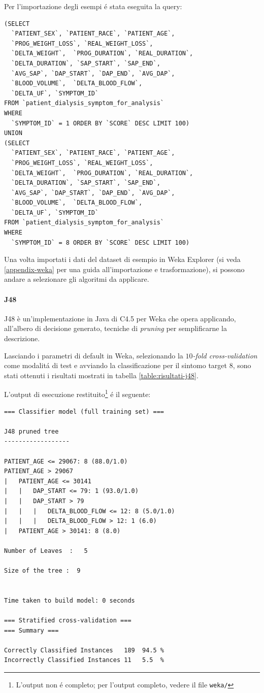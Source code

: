 \documentclass[preprint]{acm_proc_article-sp}
\begin{document}
Per l'importazione degli esempi \'e stata eseguita la query:
\begin{verbatim}
(SELECT 
  `PATIENT_SEX`, `PATIENT_RACE`, `PATIENT_AGE`,
  `PROG_WEIGHT_LOSS`, `REAL_WEIGHT_LOSS`,
  `DELTA_WEIGHT`,  `PROG_DURATION`, `REAL_DURATION`,
  `DELTA_DURATION`, `SAP_START`, `SAP_END`,
  `AVG_SAP`, `DAP_START`, `DAP_END`, `AVG_DAP`, 
  `BLOOD_VOLUME`,  `DELTA_BLOOD_FLOW`, 
  `DELTA_UF`, `SYMPTOM_ID`
FROM `patient_dialysis_symptom_for_analysis`
WHERE
  `SYMPTOM_ID` = 1 ORDER BY `SCORE` DESC LIMIT 100)
UNION
(SELECT
  `PATIENT_SEX`, `PATIENT_RACE`, `PATIENT_AGE`,
  `PROG_WEIGHT_LOSS`, `REAL_WEIGHT_LOSS`,
  `DELTA_WEIGHT`,  `PROG_DURATION`, `REAL_DURATION`,
  `DELTA_DURATION`, `SAP_START`, `SAP_END`,
  `AVG_SAP`, `DAP_START`, `DAP_END`, `AVG_DAP`, 
  `BLOOD_VOLUME`,  `DELTA_BLOOD_FLOW`, 
  `DELTA_UF`, `SYMPTOM_ID`
FROM `patient_dialysis_symptom_for_analysis`
WHERE
  `SYMPTOM_ID` = 8 ORDER BY `SCORE` DESC LIMIT 100)
\end{verbatim}

Una volta importati i dati del dataset di esempio in Weka Explorer (si veda \ref{appendix-weka} per una guida all'importazione e trasformazione), si possono andare a selezionare gli algoritmi da applicare.

\paragraph{J48}
J48 è un'implementazione in Java di C4.5 per Weka che opera applicando, all'albero di decisione generato, tecniche di \textit{pruning} per semplificarne la descrizione.

Lasciando i parametri di default in Weka, selezionando la $10$\textit{-fold cross-validation} come modalit\'a di test e avviando la classificazione per il sintomo target $8$, sono stati ottenuti i risultati mostrati in tabella \ref{table:risultati-j48}.

L'output di esecuzione restituito\footnote{L'output non \'e completo; per l'output completo, vedere il file \verb|weka/|} \'e il seguente:

\begin{verbatim}
=== Classifier model (full training set) ===

J48 pruned tree
------------------

PATIENT_AGE <= 29067: 8 (88.0/1.0)
PATIENT_AGE > 29067
|   PATIENT_AGE <= 30141
|   |   DAP_START <= 79: 1 (93.0/1.0)
|   |   DAP_START > 79
|   |   |   DELTA_BLOOD_FLOW <= 12: 8 (5.0/1.0)
|   |   |   DELTA_BLOOD_FLOW > 12: 1 (6.0)
|   PATIENT_AGE > 30141: 8 (8.0)

Number of Leaves  :   5

Size of the tree :  9


Time taken to build model: 0 seconds

=== Stratified cross-validation ===
=== Summary ===

Correctly Classified Instances   189  94.5 %
Incorrectly Classified Instances 11   5.5  %
\end{verbatim}
\end{document}
